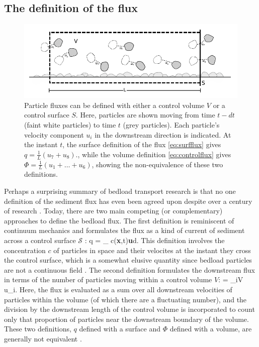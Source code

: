\subsection{The definition of the flux}
\begin{figure}[!htbp]
	\includegraphics[width=\linewidth,keepaspectratio]{./figures/ch1/fluxDefinitions.pdf}
	\caption{Particle fluxes can be defined with either a control volume $V$ or a control surface $S$. Here, particles are shown moving from time $t-dt$ (faint white particles) to time $t$ (grey particles). Each particle's velocity component $u_i$ in the downstream direction is indicated. At the instant $t$, the surface definition of the flux \ref{eq:surfflux} gives $q = \frac{1}{L}(u_7+u_8).$, while the volume definition \ref{eq:controlflux} gives $\Phi = \frac{1}{L}(u_1+\dots+u_6)$,
	showing the non-equivalence of these two definitions.}
	\label{fig:fluxdefs}
\end{figure}
Perhaps a surprising summary of bedload transport research is that no one definition of the sediment flux has even been agreed upon despite over a century of research \citep{Ballio2018}.
Today, there are two main competing (or complementary) approaches to define the bedload flux. 
The first definition is reminiscent of continuum mechanics and formulates the flux as a kind of current of sediment across a control surface $\mathcal{S}$ \citep{Furbish2012,Heyman2016, Ballio2014}: 
\be q = \int_ c(\textbf{x},t)\textbf{u}\cdot d. \label{eq:surfflux} \ee
This definition involves the concentration $c$ of particles in space and their velocites at the instant they cross the control surface, which is a somewhat elusive quantity since bedload particles are not a continuous field \citep{Heyman2016}.
The second definition formulates the downstream flux in terms of the number of particles moving within a control volume $V$:
\be \Phi =  \sum_{i\in V} u_i. \label{eq:controlflux}\ee
Here, the flux is evaluated as a sum over all downstream velocities of particles within the volume (of which there are a fluctuating number), and the division by the downstream length of the control volume is incorporated to count only that proportion of particles near the downstream boundary of the volume. These two definitions, $q$ defined with a surface and $\Phi$ defined with a volume, are generally not equivalent \citep{Ancey2020a}.


